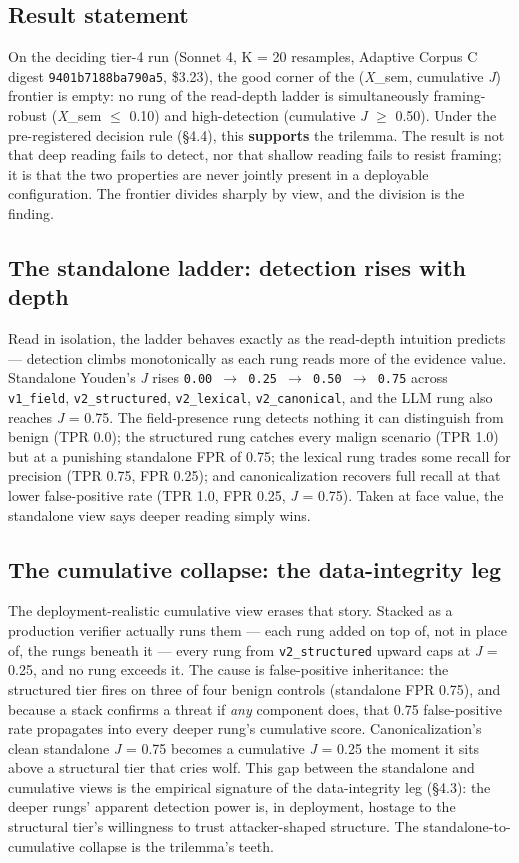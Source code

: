 \documentclass[sigconf,anonymous,review]{acmart}
\begin{document}
\subsection{Result statement}
On the deciding tier-4 run (Sonnet 4, K = 20 resamples, Adaptive Corpus C digest \texttt{9401b7188ba790a5}, \$3.23), the good corner of the (\textit{X}\_sem, cumulative \textit{J}) frontier is empty: no rung of the read-depth ladder is simultaneously framing-robust (\textit{X}\_sem $\leq$ 0.10) and high-detection (cumulative \textit{J} $\geq$ 0.50). Under the pre-registered decision rule (\S{}4.4), this \textbf{supports} the trilemma. The result is not that deep reading fails to detect, nor that shallow reading fails to resist framing; it is that the two properties are never jointly present in a deployable configuration. The frontier divides sharply by view, and the division is the finding.


\subsection{The standalone ladder: detection rises with depth}
Read in isolation, the ladder behaves exactly as the read-depth intuition predicts --- detection climbs monotonically as each rung reads more of the evidence value. Standalone Youden's \textit{J} rises \texttt{0.00 $\rightarrow$ 0.25 $\rightarrow$ 0.50 $\rightarrow$ 0.75} across \texttt{v1\_field}, \texttt{v2\_structured}, \texttt{v2\_lexical}, \texttt{v2\_canonical}, and the LLM rung also reaches \textit{J} = 0.75. The field-presence rung detects nothing it can distinguish from benign (TPR 0.0); the structured rung catches every malign scenario (TPR 1.0) but at a punishing standalone FPR of 0.75; the lexical rung trades some recall for precision (TPR 0.75, FPR 0.25); and canonicalization recovers full recall at that lower false-positive rate (TPR 1.0, FPR 0.25, \textit{J} = 0.75). Taken at face value, the standalone view says deeper reading simply wins.


\subsection{The cumulative collapse: the data-integrity leg}
The deployment-realistic cumulative view erases that story. Stacked as a production verifier actually runs them --- each rung added on top of, not in place of, the rungs beneath it --- every rung from \texttt{v2\_structured} upward caps at \textit{J} = 0.25, and no rung exceeds it. The cause is false-positive inheritance: the structured tier fires on three of four benign controls (standalone FPR 0.75), and because a stack confirms a threat if \textit{any} component does, that 0.75 false-positive rate propagates into every deeper rung's cumulative score. Canonicalization's clean standalone \textit{J} = 0.75 becomes a cumulative \textit{J} = 0.25 the moment it sits above a structural tier that cries wolf. This gap between the standalone and cumulative views is the empirical signature of the data-integrity leg (\S{}4.3): the deeper rungs' apparent detection power is, in deployment, hostage to the structural tier's willingness to trust attacker-shaped structure. The standalone-to-cumulative collapse is the trilemma's teeth.
\end{document}
